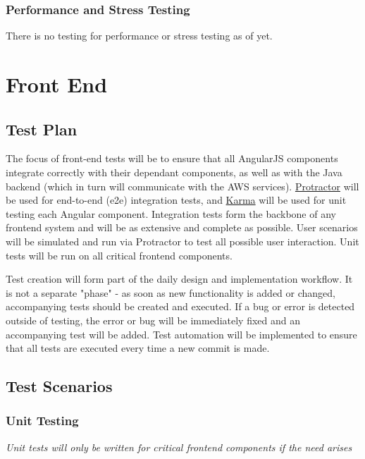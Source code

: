 \documentclass{article}
\begin{document}
			\subsubsection{Performance and Stress Testing}
			There is no testing for performance or stress testing as of yet.
\newpage

\section{Front End}
	\subsection{Test Plan}
	The focus of front-end tests will be to ensure that all AngularJS components integrate correctly with their dependant components, as well as with the Java backend (which in turn will communicate with the AWS services). \href{http://www.protractortest.org/#/}{Protractor} will be used for end-to-end (e2e) integration tests, and \href{https://karma-runner.github.io/1.0/index.html}{Karma} will be used for unit testing each Angular component. Integration tests form the backbone of any frontend system and will be as extensive and complete as possible. User scenarios will be simulated and run via Protractor to test all possible user interaction. Unit tests will be run on all critical frontend components.
	
	Test creation will form part of the daily design and implementation workflow. It is not a separate "phase" - as soon as new functionality is added or changed, accompanying tests should be created and executed. If a bug or error is detected outside of testing, the error or bug will be immediately fixed and an accompanying test will be added. Test automation will be implemented to ensure that all tests are executed every time a new commit is made. 
		
	\subsection{Test Scenarios}
		\subsubsection{Unit Testing}
			\textit{Unit tests will only be written for critical frontend components if the need arises}
\end{document}
